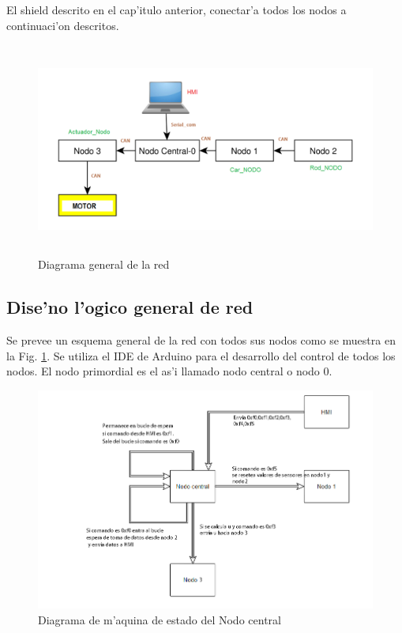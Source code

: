 El shield descrito en el cap'itulo anterior, conectar'a todos los nodos a continuaci'on descritos.
\begin{center}
\begin{figure}[ht]
	\centering
		\includegraphics[width=14cm, height=7cm]{diagramacan}
	\caption{Diagrama general de la red}
	\label{fig:diagramacan}
\end{figure}
\end{center}


\subsection{Dise'no l'ogico general  de red}
Se prevee un esquema general de la red con todos sus nodos como se muestra en la Fig. \ref{fig:diagramacan}. Se utiliza el IDE de Arduino para el desarrollo del control de todos los nodos. El nodo primordial es el as'i llamado nodo central o nodo 0.

\begin{figure}[ht]
	\centering
		\includegraphics[scale=0.65]{nodocentral}
	\caption{Diagrama de m'aquina de estado del Nodo central}
	\label{fig:nodocentral}
\end{figure}

